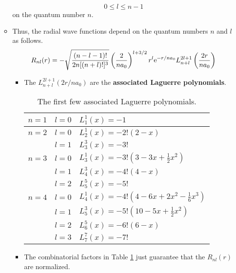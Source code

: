 \documentclass[../notes.tex]{subfiles}
\begin{document}
\begin{itemize}
\begin{itemize}
        \begin{equation*}
            0 \leq l \leq n-1
        \end{equation*}
        on the quantum number $n$.
        \item Thus, the radial wave functions depend on the quantum numbers $n$ and $l$ as follows.
        \begin{equation*}
            R_{nl}(r) = -\sqrt{\frac{(n-l-1)!}{2n[(n+l)!]^3}}\left( \frac{2}{na_0} \right)^{l+3/2}r^l\e[-r/na_0]L_{n+l}^{2l+1}\left( \frac{2r}{na_0} \right)
        \end{equation*}
        \begin{itemize}
            \item The $L_{n+l}^{2l+1}(2r/na_0)$ are the \textbf{associated Laguerre polynomials}.
            \begin{table}[h!]
                \centering
                \small
                \renewcommand{\arraystretch}{1.4}
                \begin{tabular}{lll}
                    \toprule
                    $n=1$ & $l=0$ & $L_1^1(x)=-1$\\
                    \hline
                    $n=2$ & $l=0$ & $L_2^1(x)=-2!(2-x)$\\
                          & $l=1$ & $L_3^3(x)=-3!$\\
                    \hline
                    $n=3$ & $l=0$ & $L_3^1(x)=-3!(3-3x+\frac{1}{2}x^2)$\\
                          & $l=1$ & $L_4^3(x)=-4!(4-x)$\\
                          & $l=2$ & $L_5^5(x)=-5!$\\
                    \hline
                    $n=4$ & $l=0$ & $L_4^1(x)=-4!(4-6x+2x^2-\frac{1}{6}x^3)$\\
                          & $l=1$ & $L_5^3(x)=-5!(10-5x+\frac{1}{2}x^2)$\\
                          & $l=2$ & $L_6^5(x)=-6!(6-x)$\\
                          & $l=3$ & $L_7^7(x)=-7!$\\
                    \bottomrule
                \end{tabular}
                \caption{The first few associated Laguerre polynomials.}
                \label{tab:associatedLaguerrePolynomials}
            \end{table}
            \item The combinatorial factors in Table \ref{tab:associatedLaguerrePolynomials} just guarantee that the $R_{nl}(r)$ are normalized.

\end{itemize}
\end{itemize}
\end{itemize}
\end{document}
